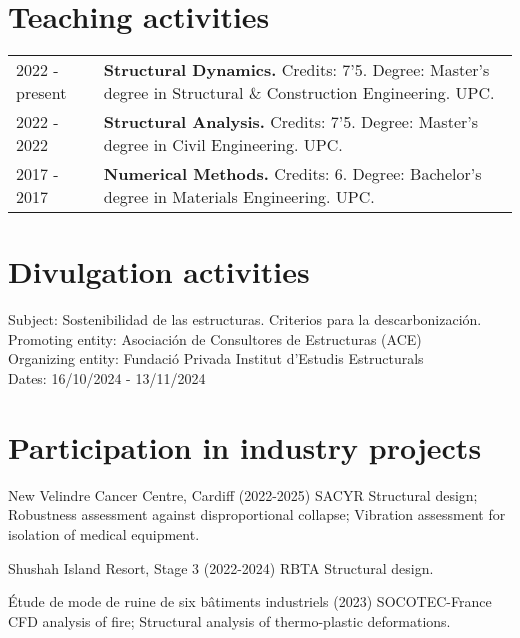 \documentclass[12pt]{article}
\begin{document}
\section{Teaching activities}
\begin{tabularx}{\linewidth}{lX}
    2022 - \small{present} &
    \textbf{Structural Dynamics.} Credits: 7'5. Degree: Master's degree in Structural \& Construction Engineering. UPC. \\

    2022 - 2022 &
    \textbf{Structural Analysis.} Credits: 7'5. Degree: Master's degree in Civil Engineering. UPC. \\

    2017 - 2017 &
    \textbf{Numerical Methods.} Credits: 6. Degree: Bachelor's degree in Materials Engineering. UPC. \\
\end{tabularx}


\printbibliography[heading={bibintoc}, title={Participation in R+D+i projects}, type=project]


\section{Divulgation activities}
\parbox{\linewidth}{
    Subject: Sostenibilidad de las estructuras. Criterios para la descarbonización. \\
    Promoting entity: Asociación de Consultores de Estructuras (ACE) \\
    Organizing entity: Fundació Privada Institut d'Estudis Estructurals \\
    Dates: 16/10/2024 - 13/11/2024
}


\section{Participation in industry projects}
\parbox{\linewidth}{
    New Velindre Cancer Centre, Cardiff (2022-2025) SACYR \newline
    Structural design;
    Robustness assessment against disproportional collapse;
    Vibration assessment for isolation of medical equipment.}

\parbox{\linewidth}{
    Shushah Island Resort, Stage 3 (2022-2024) RBTA \newline
    Structural design.}

\parbox{\linewidth}{
    Étude de mode de ruine de six bâtiments industriels (2023) SOCOTEC-France \newline
    CFD analysis of fire;
    Structural analysis of thermo-plastic deformations.}
\end{document}
